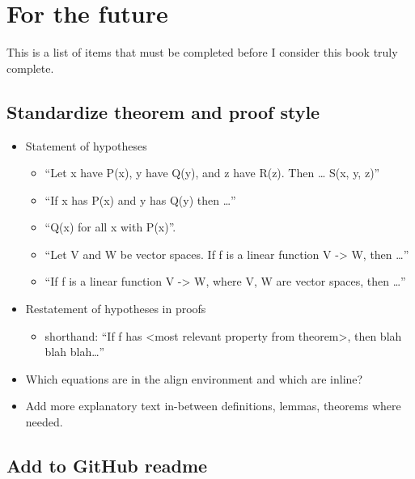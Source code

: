 \chapter*{For the future}

This is a list of items that must be completed before I consider this book truly complete.

\section*{Standardize theorem and proof style}

\begin{itemize}
    \item Statement of hypotheses
    \begin{itemize}
        \item “Let x have P(x), y have Q(y), and z have R(z). Then … S(x, y, z)”
        \item “If x has P(x) and y has Q(y) then …”
        \item “Q(x) for all x with P(x)”.
        \item “Let V and W be vector spaces. If f is a linear function V -> W, then …”
        \item “If f is a linear function V -> W, where V, W are vector spaces, then …”
    \end{itemize}
    \item Restatement of hypotheses in proofs
    \begin{itemize}
        \item shorthand: “If f has <most relevant property from theorem>, then blah blah blah…” 
    \end{itemize}
    \item Which equations are in the align environment and which are inline?
    \item Add more explanatory text in-between definitions, lemmas, theorems where needed.
\end{itemize}

\section*{Add to GitHub readme}


